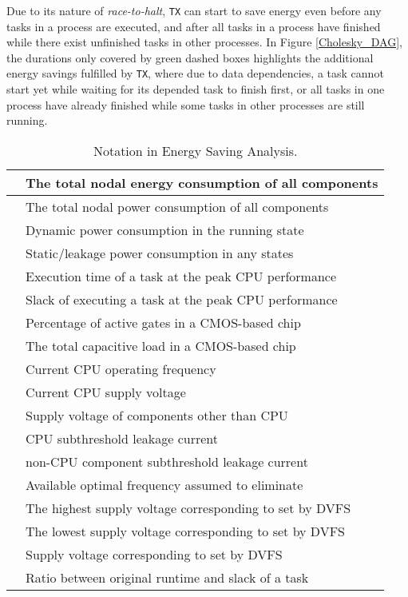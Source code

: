 \documentclass[12pt]{elsarticle}
\begin{document}
Due to its nature of \emph{race-to-halt}, \texttt{TX} can start to save energy even before any tasks in a process are executed, and after all tasks in a process have finished while there exist unfinished tasks in other processes. In Figure \ref{Cholesky_DAG}, the durations only covered by green dashed boxes highlights the additional energy savings fulfilled by \texttt{TX}, where due to data dependencies, a task cannot start yet while waiting for its depended task to finish first, or all tasks in one process have already finished while some tasks in other processes are still running.

\begin{table}\small \centering
\caption{Notation in Energy Saving Analysis.}\label{notation2}
\begin{tabular}{|c|l|}
\hline
 & The total nodal energy consumption of all components\\\hline
 & The total nodal power consumption of all components\\\hline
 & Dynamic power consumption in the running state\\\hline
 & Static/leakage power consumption in any states\\
\hline
 & Execution time of a task at the peak CPU performance\\
\hline
 & Slack of executing a task at the peak CPU performance\\
\hline
 & Percentage of active gates in a CMOS-based chip\\
\hline
 & The total capacitive load in a CMOS-based chip\\
\hline
 & Current CPU operating frequency\\
\hline
 & Current CPU supply voltage\\
\hline
 & Supply voltage of components other than CPU\\
\hline
 & CPU subthreshold leakage current\\
\hline
 & non-CPU component subthreshold leakage current\\
\hline
 & Available optimal frequency assumed to eliminate \\\hline
 & The highest supply voltage corresponding to  set by DVFS\\
\hline
 & The lowest supply voltage corresponding to  set by DVFS\\
\hline
 & Supply voltage corresponding to  set by DVFS\\\hline
 & Ratio between original runtime and slack of a task\\\hline
\end{tabular}
\normalsize
\end{table}
\end{document}
